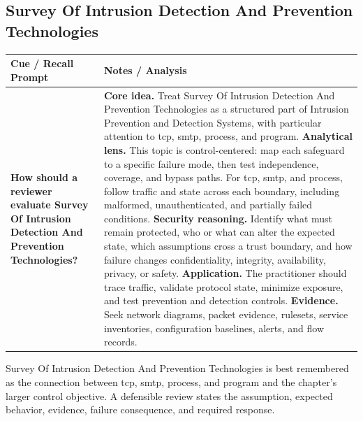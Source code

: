 \documentclass[11pt]{article}
\newcommand{\CornellHeader}{%
\rowcolor{Navy}\color{white}\bfseries Cue / Recall Prompt & \color{white}\bfseries Notes / Analysis\\\hline}
\newcommand{\CornellRow}[2]{%
\cellcolor{CueGray}\RaggedRight\textbf{#1} & \RaggedRight #2\\\hline}
\begin{document}
\subsection*{Survey Of Intrusion Detection And Prevention Technologies}
\begin{longtable}{>{\RaggedRight\arraybackslash}p{}|>{\RaggedRight\arraybackslash}p{}}
\CornellHeader
\CornellRow{How should a reviewer evaluate Survey Of Intrusion Detection And Prevention Technologies?}{\textbf{Core idea.} Treat Survey Of Intrusion Detection And Prevention Technologies as a structured part of Intrusion Prevention and Detection Systems, with particular attention to tcp, smtp, process, and program. \textbf{Analytical lens.} This topic is control-centered: map each safeguard to a specific failure mode, then test independence, coverage, and bypass paths. For tcp, smtp, and process, follow traffic and state across each boundary, including malformed, unauthenticated, and partially failed conditions. \textbf{Security reasoning.} Identify what must remain protected, who or what can alter the expected state, which assumptions cross a trust boundary, and how failure changes confidentiality, integrity, availability, privacy, or safety. \textbf{Application.} The practitioner should trace traffic, validate protocol state, minimize exposure, and test prevention and detection controls. \textbf{Evidence.} Seek network diagrams, packet evidence, rulesets, service inventories, configuration baselines, alerts, and flow records.}
\end{longtable}
\begin{topicsummary}
Survey Of Intrusion Detection And Prevention Technologies is best remembered as the connection between tcp, smtp, process, and program and the chapter's larger control objective. A defensible review states the assumption, expected behavior, evidence, failure consequence, and required response.
\end{topicsummary}
\end{document}
